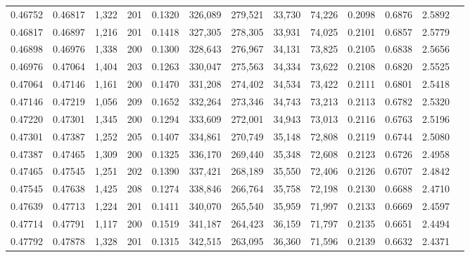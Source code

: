\begin{tabular}{rrrrrrrrrrrrr}
0.46752 & 0.46817 & 1,322 & 201 &                                     0.1320 & 326,089 & 279,521 &  33,730 &  74,226 & 0.2098 & 0.6876 & 2.5892 \\
0.46817 & 0.46897 & 1,216 & 201 &                                     0.1418 & 327,305 & 278,305 &  33,931 &  74,025 & 0.2101 & 0.6857 & 2.5779 \\
0.46898 & 0.46976 & 1,338 & 200 &                                     0.1300 & 328,643 & 276,967 &  34,131 &  73,825 & 0.2105 & 0.6838 & 2.5656 \\
0.46976 & 0.47064 & 1,404 & 203 &                                     0.1263 & 330,047 & 275,563 &  34,334 &  73,622 & 0.2108 & 0.6820 & 2.5525 \\
0.47064 & 0.47146 & 1,161 & 200 &                                     0.1470 & 331,208 & 274,402 &  34,534 &  73,422 & 0.2111 & 0.6801 & 2.5418 \\
0.47146 & 0.47219 & 1,056 & 209 &                                     0.1652 & 332,264 & 273,346 &  34,743 &  73,213 & 0.2113 & 0.6782 & 2.5320 \\
0.47220 & 0.47301 & 1,345 & 200 &                                     0.1294 & 333,609 & 272,001 &  34,943 &  73,013 & 0.2116 & 0.6763 & 2.5196 \\
0.47301 & 0.47387 & 1,252 & 205 &                                     0.1407 & 334,861 & 270,749 &  35,148 &  72,808 & 0.2119 & 0.6744 & 2.5080 \\
0.47387 & 0.47465 & 1,309 & 200 &                                     0.1325 & 336,170 & 269,440 &  35,348 &  72,608 & 0.2123 & 0.6726 & 2.4958 \\
0.47465 & 0.47545 & 1,251 & 202 &                                     0.1390 & 337,421 & 268,189 &  35,550 &  72,406 & 0.2126 & 0.6707 & 2.4842 \\
0.47545 & 0.47638 & 1,425 & 208 &                                     0.1274 & 338,846 & 266,764 &  35,758 &  72,198 & 0.2130 & 0.6688 & 2.4710 \\
0.47639 & 0.47713 & 1,224 & 201 &                                     0.1411 & 340,070 & 265,540 &  35,959 &  71,997 & 0.2133 & 0.6669 & 2.4597 \\
0.47714 & 0.47791 & 1,117 & 200 &                                     0.1519 & 341,187 & 264,423 &  36,159 &  71,797 & 0.2135 & 0.6651 & 2.4494 \\
0.47792 & 0.47878 & 1,328 & 201 &                                     0.1315 & 342,515 & 263,095 &  36,360 &  71,596 & 0.2139 & 0.6632 & 2.4371 \\

\end{tabular}
